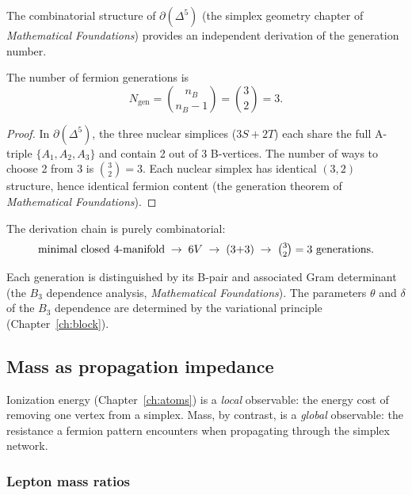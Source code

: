 The combinatorial structure of $\partial(\Delta^5)$ (the simplex geometry chapter of \textit{Mathematical Foundations}) provides an independent derivation of the generation number.

\begin{theorem}
\label{thm:gen_count}
The number of fermion generations is
\begin{equation}
N_\mathrm{gen} = \binom{n_B}{n_B - 1} = \binom{3}{2} = 3.
\end{equation}
\end{theorem}

\begin{proof}
In $\partial(\Delta^5)$, the three nuclear simplices ($3S + 2T$) each share the full A-triple $\{A_1, A_2, A_3\}$ and contain 2 out of 3 B-vertices. The number of ways to choose 2 from 3 is $\binom{3}{2} = 3$.  Each nuclear simplex has identical $(3,2)$ structure, hence identical fermion content (the generation theorem of \textit{Mathematical Foundations}).
\end{proof}

The derivation chain is purely combinatorial:
\begin{equation}
\text{minimal closed $4$-manifold} \;\to\; 6V \;\to\; (3{+}3) \;\to\; \tbinom{3}{2} = 3 \text{ generations}.
\end{equation}

Each generation is distinguished by its B-pair and associated Gram determinant (the $B_3$ dependence analysis, \textit{Mathematical Foundations}).  The parameters $\theta$ and $\delta$ of the $B_3$ dependence are determined by the variational principle (Chapter~\ref{ch:block}).

\subsection{Mass as propagation impedance}
\label{sec:mass_impedance}

Ionization energy (Chapter~\ref{ch:atoms}) is a \emph{local} observable: the energy cost of removing one vertex from a simplex.  Mass, by contrast, is a \emph{global} observable: the resistance a fermion pattern encounters when propagating through the simplex network.

\subsubsection{Lepton mass ratios}

